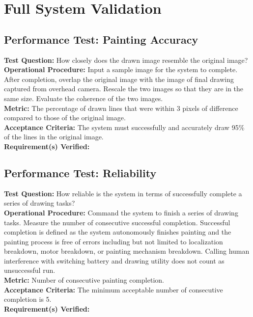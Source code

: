 
\section{Full System Validation}
\label{sec:system_validation}

\subsection{Performance Test: Painting Accuracy}
\label{test:sys_pt_accuracy}
\textbf{Test Question:} How closely does the drawn image resemble the original image?\\
\textbf{Operational Procedure:} Input a sample image for the system to complete. After completion, overlap the original image with the image of final drawing captured from overhead camera. Rescale the two images so that they are in the same size. Evaluate the coherence of the two images.\\
\textbf{Metric:} The percentage of drawn lines that were within 3 pixels of difference compared to those of the original image.\\
\textbf{Acceptance Criteria:} The system must successfully and accurately draw 95\% of the lines in the original image.\\
\textbf{Requirement(s) Verified:} 

\subsection{Performance Test: Reliability}
\label{test:sys_pt_reliability}
\textbf{Test Question:} How reliable is the system in terms of successfully complete a series of drawing tasks?\\
\textbf{Operational Procedure:} Command the system to finish a series of drawing tasks. Measure the number of consecutive successful completion. Successful completion is defined as the system autonomously finishes painting and the painting process is free of errors including but not limited to localization breakdown, motor breakdown, or painting mechanism breakdown. Calling human interference with switching battery and drawing utility does not count as unsuccessful run.\\
\textbf{Metric:} Number of consecutive painting completion. \\
\textbf{Acceptance Criteria:} The minimum acceptable number of consecutive completion is 5.\\
\textbf{Requirement(s) Verified:} 


